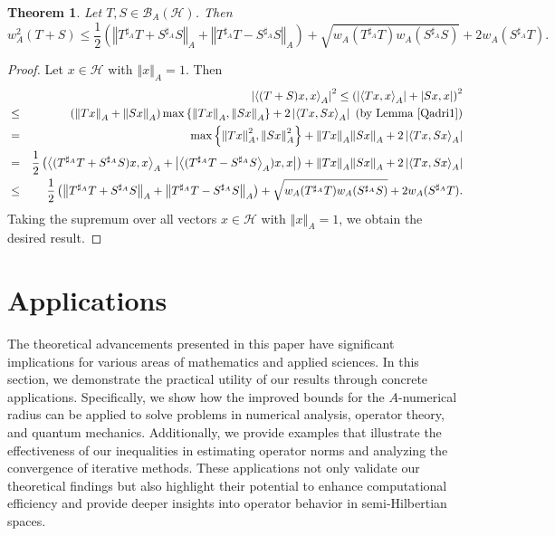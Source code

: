 \documentclass{article}
\newcommand{\bra}[1]{\left(#1\right)}
\newcommand{\seqA}[1]{{\left<#1\right>}_{A}}
\newcommand{\normA}[1]{{\left\Vert#1\right\Vert}_{A}}
\newcommand{\abs}[1]{\left\vert#1\right\vert}
\newcommand{\set}[1]{\left\{#1\right\}}
\newcommand {\Sa}{S^{\sharp_{A}}}
\newcommand {\h}{\mathcal{H}}
\newcommand {\Ta}{T^{\sharp_{A}}}
\renewcommand {\b}{\mathcal{B}}
\newtheorem{theorem}{Theorem}[section]
\begin{document}
\begin{theorem} Let $T,S\in\b_A(\h)$. Then
\begin{equation*}
  w_A^2(T+S)\leq \frac{1}{2}\bra{\normA{\Ta T+\Sa S}+\normA{\Ta T-\Sa S}}+\sqrt{w_A(\Ta T)w_A(\Sa S)}+2w_A(\Sa T).
\end{equation*}
\end{theorem}
\begin{proof} Let $x\in\h$ with $\normA{x}=1$. Then
\begin{eqnarray*}
  &&\abs{\seqA{(T+S)x,x}}^2 \leq \bra{\abs{\seqA{Tx,x}}+\abs{Sx,x}}^2 \\
   &\leq&\bra{\normA{Tx}+\normA{Sx}}\max\set{\normA{Tx},\normA{Sx}} +2\abs{\seqA{Tx,Sx}}\,\,\bra{\mbox{by Lemma \ref{Qadri1}}}\\
   &=&\max\set{\normA{Tx}^2,\normA{Sx}^2}+\normA{Tx}\normA{Sx}+2\abs{\seqA{Tx,Sx}}\\
   &=&\frac{1}{2}\bra{\seqA{(\Ta T+\Sa S)x,x}+\abs{\seqA{(\Ta T-\Sa S})x,x}}+\normA{Tx}\normA{Sx}+2\abs{\seqA{Tx,Sx}}\\
   &\leq& \frac{1}{2}\bra{\normA{\Ta T+\Sa S}+\normA{\Ta T-\Sa S}}+\sqrt{w_A(\Ta T)w_A(\Sa S)}+2w_A(\Sa T).
\end{eqnarray*}
Taking the supremum over all vectors $x\in\h$ with $\normA{x}=1$, we obtain the desired result.
\end{proof}
\section{Applications}
The theoretical advancements presented in this paper have significant implications for various areas of mathematics and applied sciences. In this section, we demonstrate the practical utility of our results through concrete applications. Specifically, we show how the improved bounds for the $A$-numerical radius can be applied to solve problems in numerical analysis, operator theory, and quantum mechanics. Additionally, we provide examples that illustrate the effectiveness of our inequalities in estimating operator norms and analyzing the convergence of iterative methods. These applications not only validate our theoretical findings but also highlight their potential to enhance computational efficiency and provide deeper insights into operator behavior in semi-Hilbertian spaces.
\end{document}
